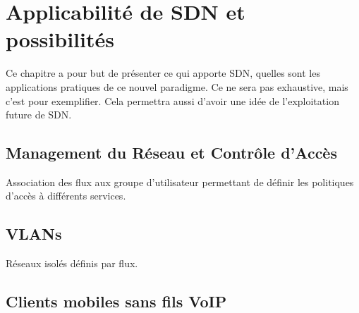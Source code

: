 \chapter{Applicabilité de SDN et possibilités}

Ce chapitre a pour but de présenter ce qui apporte SDN, quelles sont les applications pratiques de ce nouvel paradigme. Ce ne sera pas exhaustive, mais c'est pour exemplifier. Cela permettra aussi d'avoir une idée de l'exploitation future de SDN.

\section{Management du Réseau et Contrôle d'Accès}
Association des flux aux groupe d'utilisateur permettant de définir les politiques d'accès à différents services.

\section{VLANs}
Réseaux isolés définis par flux.

\section{Clients mobiles sans fils VoIP}
